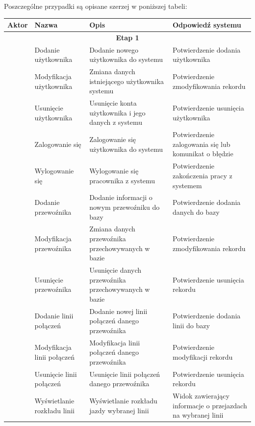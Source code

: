 \documentclass[10pt,a4paper]{article}
\begin{document}
\noindent
Poszczególne przypadki są opisane szerzej w poniższej tabeli:
\begin{table}[H]
	\begin{tabularx}{\textwidth}{|c|X|X|X|}
		\hline
		\textbf{Aktor} & \textbf{Nazwa} & \textbf{Opis} & \textbf{Odpowiedź systemu} \\
		\hline
		\multicolumn{4}{|c|}{\textbf{Etap 1}} \\
		\hline
		\multirow{6}{*}{\rotatebox[origin=c]{90}{Administrator}}
		& Dodanie użytkownika
		& Dodanie nowego użytkownika do systemu
		& Potwierdzenie dodania użytkownika \\
		\cline {2-4}
		& Modyfikacja użytkownika
		& Zmiana danych istniejącego użytkownika systemu
		& Potwierdzenie zmodyfikowania rekordu \\
		\cline{2-4}
		& Usunięcie użytkownika
		& Usunięcie konta użytkownika i jego danych z systemu
		& Potwierdzenie usunięcia użytkownika \\
		\hline
		\multirow{26}{*}{\rotatebox[origin=c]{90}{Pracownik}}
		& Zalogowanie się 
		& Zalogowanie się użytkownika do systemu
		& Potwierdzenie zalogowania się lub komunikat o błędzie \\
		\cline{2-4}
		& Wylogowanie się
		& Wylogowanie się pracownika z systemu
		& Potwierdzenie zakończenia pracy z systemem \\
		\cline{2-4}
		& Dodanie przewoźnika
		& Dodanie informacji o nowym przewoźniku do bazy
		& Potwierdzenie dodania danych do bazy \\
		\cline{2-4}
		& Modyfikacja przewoźnika
		& Zmiana danych przewoźnika przechowywanych w bazie
		& Potwierdzenie zmodyfikowania rekordu \\
		\cline{2-4}
		& Usunięcie przewoźnika
		& Usunięcie danych przewoźnika przechowywanych w bazie
		& Potwierdzenie usunięcia rekordu \\
		\cline{2-4}
		& Dodanie linii połączeń
		& Dodanie nowej linii połączeń danego przewoźnika
		& Potwierdzenie dodania linii do bazy \\
		\cline{2-4}
		& Modyfikacja linii połączeń
		& Modyfikacja linii połączeń danego przewoźnika
		& Potwierdzenie modyfikacji rekordu \\
		\cline{2-4}
		& Usunięcie linii połączeń
		& Usunięcie linii połączeń danego przewoźnika
		& Potwierdzenie usunięcia rekordu \\
		\cline{2-4}
		& Wyświetlanie rozkładu linii
		& Wyświetlanie rozkładu jazdy wybranej linii
		& Widok zawierający informacje o przejazdach na wybranej linii \\

\end{tabularx}
\end{table}
\end{document}
